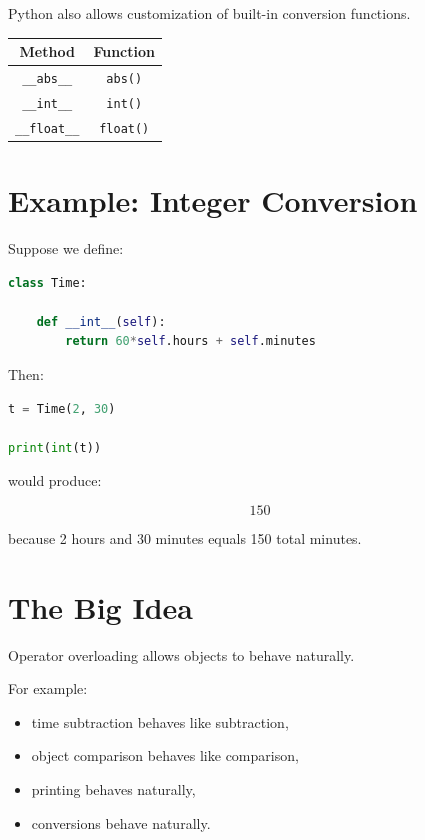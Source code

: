 \documentclass[11pt]{article}
\begin{document}
Python also allows customization of built-in conversion functions.

\begin{center}
\begin{tabular}{cc}
\toprule
Method & Function \\
\midrule
\verb|__abs__| & \verb|abs()| \\
\verb|__int__| & \verb|int()| \\
\verb|__float__| & \verb|float()| \\
\bottomrule
\end{tabular}
\end{center}

\section{Example: Integer Conversion}

Suppose we define:

\begin{lstlisting}[language=Python]
class Time:

    def __int__(self):
        return 60*self.hours + self.minutes
\end{lstlisting}

Then:

\begin{lstlisting}[language=Python]
t = Time(2, 30)

print(int(t))
\end{lstlisting}

would produce:

\[
150
\]

because 2 hours and 30 minutes equals 150 total minutes.

\section{The Big Idea}

Operator overloading allows objects to behave naturally.

For example:

\begin{itemize}
    \item time subtraction behaves like subtraction,
    \item object comparison behaves like comparison,
    \item printing behaves naturally,
    \item conversions behave naturally.
\end{itemize}
\end{document}
